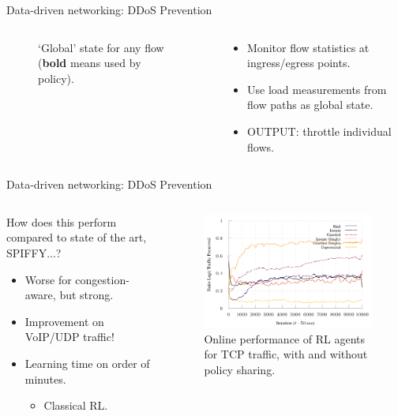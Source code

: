 \documentclass[aspectratio=169,xcolor={dvipsnames}
,handout
]{beamer}
\begin{document}
\begin{frame}{Data-driven networking: DDoS Prevention}
\begin{columns}
\begin{column}{0.6\linewidth}
\begin{figure}
{\begin{tikzpicture}
					\end{tikzpicture}
				}
			\caption{`Global' state for any flow (\textbf{bold} means used by policy).}
			\end{figure}
		\end{column}
		\begin{column}{0.4\linewidth}
			\begin{itemize}
				\item Monitor flow statistics at ingress/egress points.
				\item Use load measurements from flow paths as global state.
				\item OUTPUT: throttle individual flows.
			\end{itemize}
		\end{column}
	\end{columns}
\end{frame}

\begin{frame}{Data-driven networking: DDoS Prevention}
	\begin{columns}
		\begin{column}{0.3\linewidth}
			How does this perform compared to state of the art, SPIFFY...?
			\begin{itemize}
				\item Worse for congestion-aware, but strong.
				\item \alert{Improvement on VoIP/UDP traffic!}
				\item Learning time on order of minutes.
				\begin{itemize}
					\item Classical RL.
				\end{itemize}
			\end{itemize}
		\end{column}
		\begin{column}{0.7\linewidth}
			\begin{figure}
				\centering
				\includegraphics[width=0.75\linewidth]{tnsm-tcp-16-single}
				\caption{
					Online performance of RL agents for TCP traffic, with and without policy sharing.
					\label{fig:tcp-tree-16}
				}
			\end{figure}
		\end{column}
	\end{columns}
\end{frame}
\end{document}
